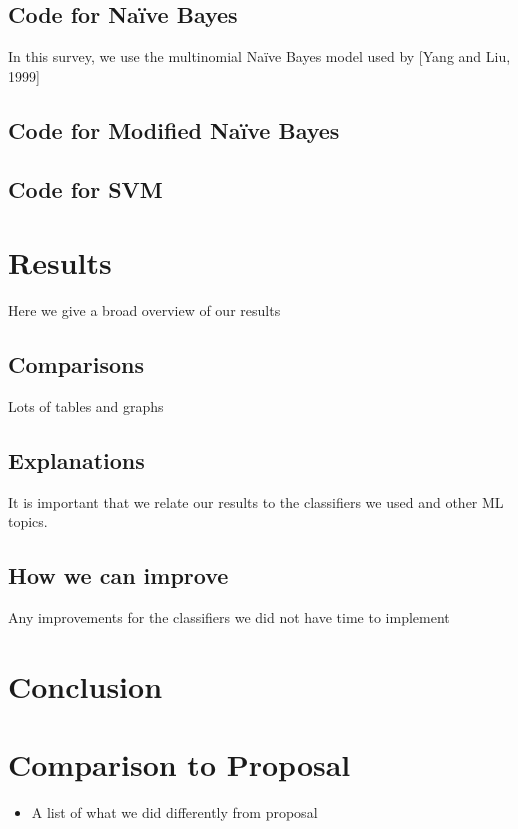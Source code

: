\documentclass[11pt,letterpaper]{article}
\begin{document}
\subsection{Code for Na{\"i}ve Bayes}
  In this survey, we use the multinomial Na{\"i}ve Bayes model used by [Yang and Liu, 1999]

\subsection{Code for Modified Na{\"i}ve Bayes}

\subsection{Code for SVM}

\section{Results}
Here we give a broad overview of our results

\subsection{Comparisons}
Lots of tables and graphs

\subsection{Explanations}
It is important that we relate our results  to the classifiers we used and other ML topics.

\subsection{How we can improve}
Any improvements for the classifiers we did not have time to implement

\section{Conclusion}

\section{Comparison to Proposal}

\begin{itemize}
\item A list of what we did differently from proposal
\end{itemize}
\end{document}
